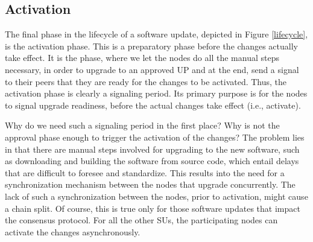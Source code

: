\subsection{Activation}

The final phase in the lifecycle of a software update, depicted in Figure \ref{lifecycle}, is the activation phase. This is a preparatory phase before the changes actually take effect. It is the phase, where we let the nodes do all the manual steps necessary, in order to upgrade to an approved UP and at the end, send a signal to their peers that they are ready for the changes to be activated. Thus, the activation phase is clearly a signaling period. Its primary purpose is for the nodes to signal upgrade readiness, before the actual changes take effect (i.e., activate). 

Why do we need such a signaling period in the first place? Why is not the approval phase enough to trigger the activation of the changes? The problem lies in that there are manual steps involved for upgrading to the new software, such as downloading and building the software from source code, which entail delays that are difficult to foresee and standardize. This results into the need for a synchronization mechanism between the nodes that upgrade concurrently. The lack of such a synchronization between the nodes, prior to activation, might cause a chain split. Of course, this is true only for those software updates that impact the consensus protocol. For all the other SUs, the participating nodes can activate the changes asynchronously. %


